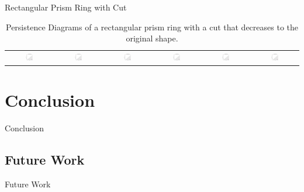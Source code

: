 \documentclass[xcolor=dvipsnames]{beamer}
\begin{document}
\begin{frame}{Rectangular Prism Ring with Cut}
\begin{table}[H]
\begin{tabular}{cccccc}
\includegraphics[width=0.18\textwidth]{Final Run, (rect prism ring 10 mm cut) persdia.png} & 
\includegraphics[width=0.18\textwidth]{Final Run, (rect prism ring 05 mm cut) persdia.png} & 
\includegraphics[width=0.18\textwidth]{Final Run, (rect prism ring 03 mm cut) persdia.png} &
\includegraphics[width=0.18\textwidth]{Final Run, (rect prism ring 02 mm cut) persdia.png} &
\includegraphics[width=0.18\textwidth]{Final Run, (rect prism ring 01 mm cut) persdia.png} &
\includegraphics[width=0.18\textwidth]{Final Run, (rect prism ring 00 mm cut) persdia.png} \\
\end{tabular}
\caption{Persistence Diagrams of a rectangular prism ring with a cut that decreases to the original shape.}
\label{fig:rect_prism_ring_persdia_table}
\end{table}
\end{frame}

\section{Conclusion}
\begin{frame}{Conclusion}

\end{frame}

\subsection{Future Work}
\begin{frame}{Future Work}

\end{frame}
\end{document}
